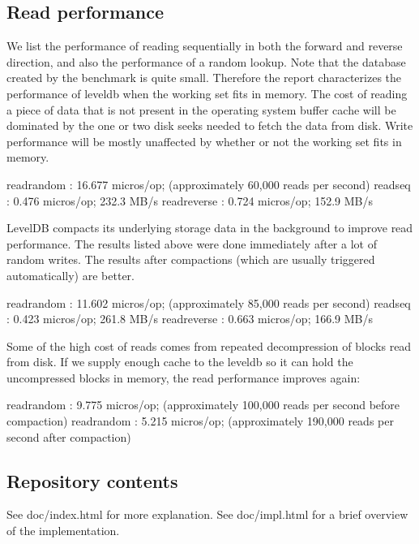 \subsection*{Read performance}

We list the performance of reading sequentially in both the forward and reverse direction, and also the performance of a random lookup. Note that the database created by the benchmark is quite small. Therefore the report characterizes the performance of leveldb when the working set fits in memory. The cost of reading a piece of data that is not present in the operating system buffer cache will be dominated by the one or two disk seeks needed to fetch the data from disk. Write performance will be mostly unaffected by whether or not the working set fits in memory. \begin{DoxyVerb}readrandom   :      16.677 micros/op;  (approximately 60,000 reads per second)
readseq      :       0.476 micros/op;  232.3 MB/s
readreverse  :       0.724 micros/op;  152.9 MB/s
\end{DoxyVerb}


Level\+D\+B compacts its underlying storage data in the background to improve read performance. The results listed above were done immediately after a lot of random writes. The results after compactions (which are usually triggered automatically) are better. \begin{DoxyVerb}readrandom   :      11.602 micros/op;  (approximately 85,000 reads per second)
readseq      :       0.423 micros/op;  261.8 MB/s
readreverse  :       0.663 micros/op;  166.9 MB/s
\end{DoxyVerb}


Some of the high cost of reads comes from repeated decompression of blocks read from disk. If we supply enough cache to the leveldb so it can hold the uncompressed blocks in memory, the read performance improves again\+: \begin{DoxyVerb}readrandom   :       9.775 micros/op;  (approximately 100,000 reads per second before compaction)
readrandom   :       5.215 micros/op;  (approximately 190,000 reads per second after compaction)
\end{DoxyVerb}


\subsection*{Repository contents}

See doc/index.\+html for more explanation. See doc/impl.\+html for a brief overview of the implementation.

